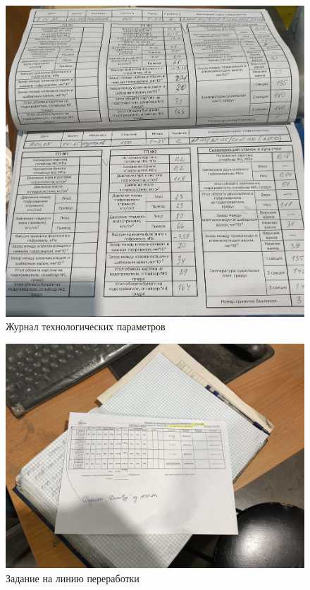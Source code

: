 \begin{figure}
\begin{center}
 \includegraphics[height=0.7\textheight, keepaspectratio]{Pics/V журнал техн параметров.jpg}
\end{center}
 \caption{Журнал технологических параметров}
 \label{pic:V журнал техн параметров}
\end{figure}

\begin{figure}
\begin{center}
 \includegraphics[height=0.5\textheight, keepaspectratio]{Pics/VI задание для переработки.jpg}
\end{center}
 \caption{Задание на линию переработки}
 \label{pic:VI задание для переработки}
\end{figure}


